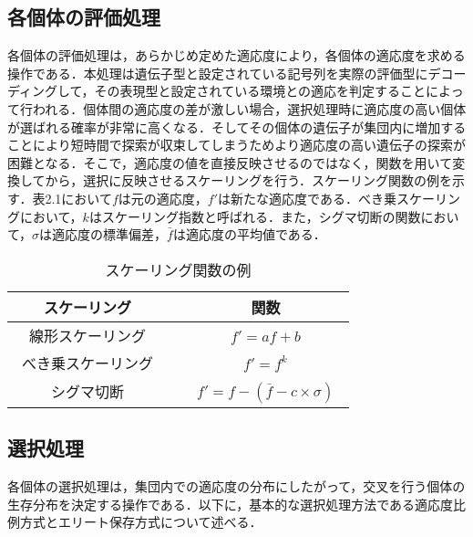 \subsection{各個体の評価処理}
\label{sec2.1.2}
  
各個体の評価処理は，あらかじめ定めた適応度により，各個体の適応度を求める操作である．本処理は遺伝子型と設定されている記号列を実際の評価型にデコーディングして，その表現型と設定されている環境との適応を判定することによって行われる．個体間の適応度の差が激しい場合，選択処理時に適応度の高い個体が選ばれる確率が非常に高くなる．そしてその個体の遺伝子が集団内に増加することにより短時間で探索が収束してしまうためより適応度の高い遺伝子の探索が困難となる．そこで，適応度の値を直接反映させるのではなく，関数を用いて変換してから，選択に反映させるスケーリングを行う．スケーリング関数の例を示す．表2.1において$f$は元の適応度，$f'$は新たな適応度である．べき乗スケーリングにおいて，$k$はスケーリング指数と呼ばれる．また，シグマ切断の関数において，$\sigma$は適応度の標準偏差，$\bar{f}$は適応度の平均値である．

\begin{table}[!ht]
\caption{スケーリング関数の例}
\label{tb:sk}
\begin{center}
\begin{tabular}{|c||c|}\hline
スケーリング　&　関数　\\ \hline
線形スケーリング　&　$f'=af+b$　\\ \hline
べき乗スケーリング　&　$f'=f^{k}$　\\ \hline
シグマ切断　&　$f'=f-( \bar{f} - c \times \sigma )$　\\ \hline
\end{tabular}
\end{center}
\end{table}

\subsection{選択処理}
\label{sec2.1.3}

各個体の選択処理は，集団内での適応度の分布にしたがって，交叉を行う個体の生存分布を決定する操作である．以下に，基本的な選択処理方法である適応度比例方式とエリート保存方式について述べる．

